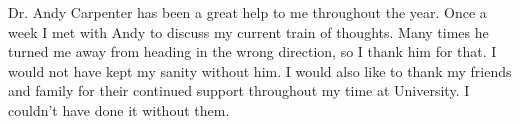 Dr. Andy Carpenter has been a great help to me throughout the year. Once a week I met with Andy to discuss my current train of thoughts. Many times he turned me away from heading in the wrong direction, so I thank him for that. I would not have kept my sanity without him. I would also like to thank my friends and family for their continued support throughout my time at University. I couldn't have done it without them.